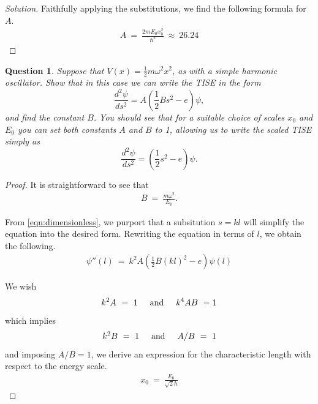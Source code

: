 \documentclass{article}
\numberwithin{equation}{section}
\newcommand{\textAnd}{
    {
        \hspace{5mm}
        \textrm{and}
        \hspace{5mm}
    }
}
\newtheorem{question}{Question}[section]
\begin{document}
\begin{proof}[Solution]
    Faithfully applying the substitutions, 
    we find the following 
    formula for $A$. 
    \begin{align}
        A \ = \ 
        \frac {2m E_0 x_0 ^2 }{\hbar^2} 
        \ \approx \ 26.24
    \end{align}
\end{proof}

\begin{question}

Suppose that $V(x) = \frac{1}{2} m \omega^2 x^2$, as with a simple harmonic oscillator. Show that in this case we can write the TISE in the form
\[
    \frac{d^2 \psi}{ds^2} = A \left( \frac{1}{2} B s^2 - e \right) \psi,
\]
and find the constant $B$. You should see that for a suitable choice of scales $x_0$ and $E_0$ you can set both constants $A$ and $B$ to 1, allowing us to write the scaled TISE simply as
\[
    \frac{d^2 \psi}{ds^2} = \left( \frac{1}{2} s^2 - e \right) \psi.
\]
\end{question}

\begin{proof}
    It is straightforward to see that \begin{align}
        B \ = \ \frac {m \omega^2} {E_0}.
    \end{align}

    From \eqref{eqn:dimensionless}, we purport that a 
    subsitution $s = kl$ will simplify the equation into 
    the desired form. Rewriting the equation in terms of $l$, 
    we obtain the following. 
    \begin{align}
        \psi''(l) \ = \ k^2 A \left(
            \frac 1 2 B (kl)^2 - e 
        \right)\psi(l)
    \end{align}

    We wish 
    \begin{align}
        k^2 A  \ = \ 1 \textAnd k^4 A B \ = 1
    \end{align}
    which implies 
    \begin{align}
        k^2 B \ = \ 1 \textAnd A/B \ = \ 1
    \end{align}
    and imposing $A/B = 1$, we derive an expression 
    for the characteristic length with respect to the energy scale. 
    \begin{align}\boxed{
        x_0 \ = \ \frac {E_0} {\sqrt 2 \hbar}}
    \end{align}
\end{proof}
\end{document}
